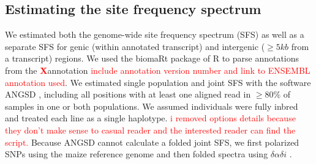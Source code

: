 \documentclass{pnastwo}
\newcommand{\jri}[1]{\textcolor{red}{\scriptsize #1}}
\newcommand{\X}{\textcolor{red}{\bf X}}
\begin{document}
\begin{article}
\begin{materials}
\subsection{Estimating the site frequency spectrum}
We estimated both the genome-wide site frequency spectrum (SFS) as well as a separate SFS for genic (within annotated transcript) and intergenic ($\geq 5kb$ from a transcript) regions. 
We used the biomaRt package \cite{durinck2009,durinck2005} of R \cite{R2014} to parse annotations from the \X annotation \jri{include annotation version number and link to ENSEMBL annotation used}. 
We estimated single population and joint SFS with the software ANGSD \cite{korneliussen2014}, including all positions with at least one aligned read in $\geq 80\%$ of samples in one or both populations.
We assumed individuals were fully inbred and treated each line as a single haplotype. \jri{i removed options details because they don't make sense to casual reader and the interested reader can find the script. }
Because ANGSD cannot calculate a folded joint SFS, we first polarized SNPs using the maize reference genome and then folded spectra using $\delta\alpha\delta{i}$ \cite{gutenkunst2009}.


\end{materials}
\end{article}
\end{document}
